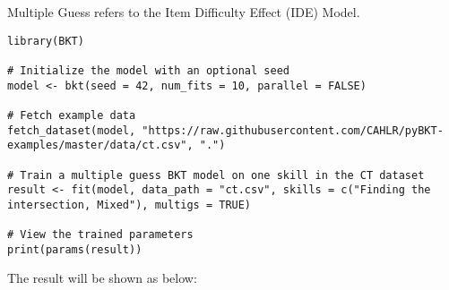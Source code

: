 \documentclass{article}
\begin{document}
Multiple Guess refers to the Item Difficulty Effect (IDE) Model.

\begin{lstlisting}[caption={R code to train an ILE BKT model}]
library(BKT)

# Initialize the model with an optional seed
model <- bkt(seed = 42, num_fits = 10, parallel = FALSE)

# Fetch example data
fetch_dataset(model, "https://raw.githubusercontent.com/CAHLR/pyBKT-examples/master/data/ct.csv", ".")

# Train a multiple guess BKT model on one skill in the CT dataset
result <- fit(model, data_path = "ct.csv", skills = c("Finding the intersection, Mixed"), multigs = TRUE)

# View the trained parameters
print(params(result))
\end{lstlisting}

The result will be shown as below:
\end{document}
